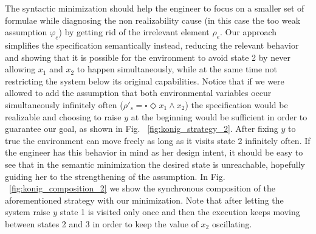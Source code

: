 The syntactic minimization should help the engineer to focus on a smaller set of formulae while diagnosing the non realizability cause (in this case the too weak assumption $\varphi_e$) by getting rid of the irrelevant element $\rho_e$. Our approach simplifies the specification semantically instead, reducing the relevant behavior and showing that it is possible for the environment to avoid state 2 by never allowing $x_1$ and $x_2$ to happen simultaneously, while at the same time not restricting the system below its original capabilities. Notice that if we were allowed to add the assumption that both environmental variables occur simultaneously infinitely often ($\rho'_s = \square \Diamond x_1 \wedge x_2$) the specification would be realizable and choosing to raise $y$ at the beginning would be sufficient in order to guarantee our goal, as shown in Fig. ~\ref{fig:konig_strategy_2}. After fixing $y$ to true the environment can move freely as long as it visits state 2 infinitely often. If the engineer has this behavior in mind as her design intent, it should be easy to see that in the semantic minimization the desired state is unreachable, hopefully guiding her to the strengthening of the assumption.  In Fig. ~\ref{fig:konig_composition_2} we show the synchronous composition of the aforementioned strategy with our minimization. Note that after letting the system raise $y$ state 1 is visited only once and then the execution keeps moving between states 2 and 3 in order to keep the value of $x_2$ oscillating.
